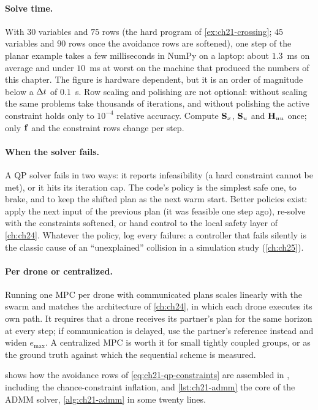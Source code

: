 \paragraph{Solve time.}
With $30$ variables and $75$ rows (the hard program of
\cref{ex:ch21-crossing}; $45$ variables and $90$ rows once the avoidance rows
are softened), one step of the planar example takes a few milliseconds in
NumPy on a laptop: about $1.3$~ms on average and under $10$~ms at worst on the
machine that produced the numbers of this chapter. The figure is hardware
dependent, but it is an order of magnitude below a $\Delta t$ of $0.1$~s. Row scaling and
polishing are not optional: without scaling the same problems take thousands
of iterations, and without polishing the active constraint holds only to
$10^{-4}$ relative accuracy. Compute $\mathbf{S}_x$, $\mathbf{S}_u$ and
$\mathbf{H}_{uu}$ once; only $\mathbf{f}$ and the constraint rows change per step.

\paragraph{When the solver fails.}
A QP solver fails in two ways: it reports infeasibility (a hard constraint
cannot be met), or it hits its iteration cap. The code's policy is the
simplest safe one, to brake, and to keep the shifted plan as the next warm
start. Better policies exist: apply the next input of the previous plan (it
was feasible one step ago), re-solve with the constraints softened, or hand
control to the local safety layer of \cref{ch:ch24}. Whatever the policy, log
every failure: a controller that fails silently is the classic cause of an
``unexplained'' collision in a simulation study (\cref{ch:ch25}).

\paragraph{Per drone or centralized.}
Running one MPC per drone with communicated plans scales linearly with the
swarm and matches the architecture of \cref{ch:ch24}, in which each drone
executes its own \cbs path. It requires that a drone receives its partner's
plan for the same horizon at every step; if communication is delayed, use the
partner's reference instead and widen $e_{\max}$. A centralized MPC is
worth it for small tightly coupled groups, or as the ground truth against
which the sequential scheme is measured.

 shows how the avoidance rows of
\cref{eq:ch21-qp-constraints} are assembled in , including the
chance-constraint inflation, and \cref{lst:ch21-admm} the core of the ADMM
solver, \cref{alg:ch21-admm} in some twenty lines.

